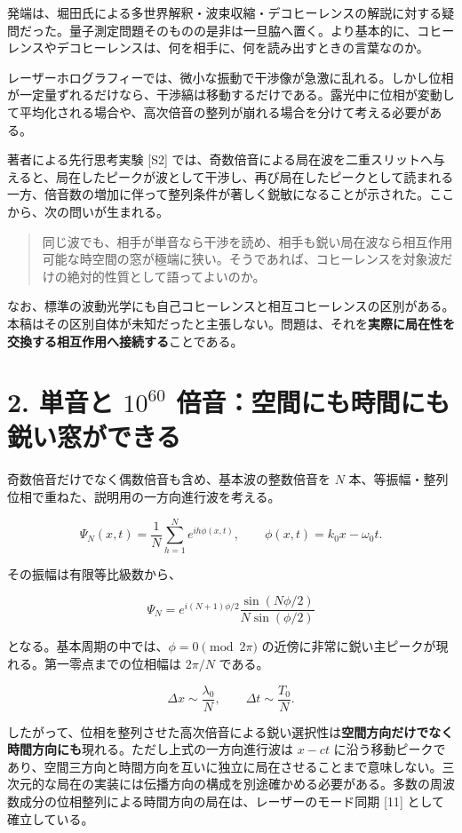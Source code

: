 \documentclass[
  a4paper,
]{ltjsarticle}
\begin{document}
発端は、堀田氏による多世界解釈・波束収縮・デコヒーレンスの解説に対する疑問だった。量子測定問題そのものの是非は一旦脇へ置く。より基本的に、コヒーレンスやデコヒーレンスは、何を相手に、何を読み出すときの言葉なのか。

レーザーホログラフィーでは、微小な振動で干渉像が急激に乱れる。しかし位相が一定量ずれるだけなら、干渉縞は移動するだけである。露光中に位相が変動して平均化される場合や、高次倍音の整列が崩れる場合を分けて考える必要がある。

著者による先行思考実験 {[}S2{]}
では、奇数倍音による局在波を二重スリットへ与えると、局在したピークが波として干渉し、再び局在したピークとして読まれる一方、倍音数の増加に伴って整列条件が著しく鋭敏になることが示された。ここから、次の問いが生まれる。

\begin{quote}
同じ波でも、相手が単音なら干渉を読め、相手も鋭い局在波なら相互作用可能な時空間の窓が極端に狭い。そうであれば、コヒーレンスを対象波だけの絶対的性質として語ってよいのか。
\end{quote}

なお、標準の波動光学にも自己コヒーレンスと相互コヒーレンスの区別がある。本稿はその区別自体が未知だったと主張しない。問題は、それを\textbf{実際に局在性を交換する相互作用へ接続する}ことである。

\section{\texorpdfstring{2. 単音と \(10^{60}\)
倍音：空間にも時間にも鋭い窓ができる}{2. 単音と 10\^{}\{60\} 倍音：空間にも時間にも鋭い窓ができる}}\label{ux5358ux97f3ux3068-1060-ux500dux97f3ux7a7aux9593ux306bux3082ux6642ux9593ux306bux3082ux92edux3044ux7a93ux304cux3067ux304dux308b}

奇数倍音だけでなく偶数倍音も含め、基本波の整数倍音を \(N\)
本、等振幅・整列位相で重ねた、説明用の一方向進行波を考える。

\[
\Psi_N(x,t)=\frac1N\sum_{h=1}^{N}e^{ih\phi(x,t)},
\qquad \phi(x,t)=k_0x-\omega_0t.
\]

その振幅は有限等比級数から、

\[
\Psi_N=e^{i(N+1)\phi/2}
\frac{\sin(N\phi/2)}{N\sin(\phi/2)}
\]

となる。基本周期の中では、\(\phi=0\pmod{2\pi}\)
の近傍に非常に鋭い主ピークが現れる。第一零点までの位相幅は \(2\pi/N\)
である。

\[
\Delta x\sim\frac{\lambda_0}{N},
\qquad
\Delta t\sim\frac{T_0}{N}.
\]

したがって、位相を整列させた高次倍音による鋭い選択性は\textbf{空間方向だけでなく時間方向にも}現れる。ただし上式の一方向進行波は
\(x-ct\)
に沿う移動ピークであり、空間三方向と時間方向を互いに独立に局在させることまで意味しない。三次元的な局在の実装には伝播方向の構成を別途確かめる必要がある。多数の周波数成分の位相整列による時間方向の局在は、レーザーのモード同期
{[}11{]} として確立している。
\end{document}
